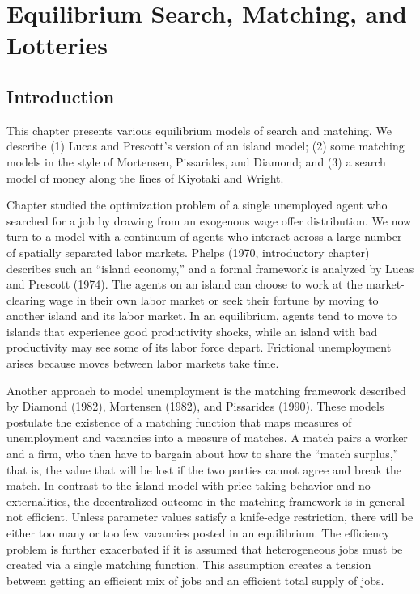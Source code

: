 

%


%
%
\def\lege{\raise.3ex\hbox{$>$\kern-.75em\lower1ex\hbox{$<$}}}

\chapter{Equilibrium Search, Matching, and Lotteries\label{search2}}

\section{Introduction}

   This chapter presents various equilibrium models of search and matching. We
describe (1) Lucas and Prescott's version of an island model; (2) some matching
models in the style of Mortensen, Pissarides, and Diamond; and (3) a
search model of money along the lines of Kiyotaki and Wright.

Chapter  studied the optimization problem of a single
unemployed agent who searched for a job by drawing from an
exogenous wage offer distribution.  We now turn to a model with a
continuum of agents who interact across a large number of
spatially separated labor markets. Phelps (1970, introductory
chapter)
%
describes such an ``island economy,''
%
and a formal framework is analyzed by Lucas and Prescott (1974).
%
The agents on an island can choose to work at
the market-clearing wage in their own labor market or seek their
fortune by moving to another island and its labor market. In an equilibrium,
agents tend to move to islands that experience good productivity shocks,
while an island with bad productivity may see some of its labor force depart.
Frictional unemployment arises because moves between labor markets take
time.

Another approach to model unemployment is the matching framework
%
described by Diamond (1982), Mortensen (1982), and Pissarides (1990).
%
These models postulate the existence of a matching function that
maps measures of unemployment and vacancies into a measure of matches. A match
pairs a worker and a firm, who then have to bargain about how to share the
``match surplus,''
%
that is, the value that will be lost if the two parties cannot agree and
break the match. In contrast to the island model with price-taking behavior
and no externalities, the decentralized outcome in the matching framework is
in general not efficient. Unless parameter values satisfy a knife-edge
restriction, there will be either  too many or too few vacancies posted
in an equilibrium.  The efficiency problem is further exacerbated if it is
assumed that heterogeneous jobs must be created via a single matching function.
This assumption creates a tension between getting an efficient mix of jobs and
an efficient total supply of jobs.

